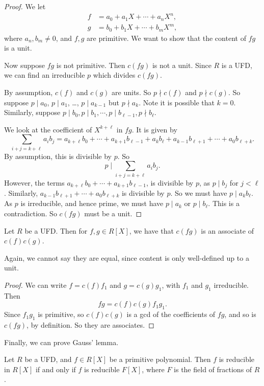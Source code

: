 \documentclass[a4paper]{article}
\begin{document}
\begin{proof}
  We let
  \begin{align*}
    f &= a_0 + a_1X + \cdots + a_n X^n,\\
    g &= b_0 + b_1X + \cdots + b_m X^m,
  \end{align*}
  where $a_n, b_m \not= 0$, and $f, g$ are primitive. We want to show that the content of $fg$ is a unit.

  Now suppose $fg$ is not primitive. Then $c(fg)$ is not a unit. Since $R$ is a UFD, we can find an irreducible $p$ which divides $c(fg)$.

  By assumption, $c(f)$ and $c(g)$ are units. So $p\nmid c(f)$ and $p \nmid c(g)$. So suppose $p \mid a_0$, $p \mid a_1$, \ldots, $p \mid a_{k - 1}$ but $p \nmid a_k$. Note it is possible that $k = 0$. Similarly, suppose $p\mid b_0, p \mid b_1, \cdots, p\mid b_{\ell - 1}, p \nmid b_\ell$.

  We look at the coefficient of $X^{k + \ell}$ in $fg$. It is given by
  \[
    \sum_{i + j = k + \ell} a_i b_j = a_{k + \ell}b_0 + \cdots + a_{k + 1}b_{\ell - 1} + a_k b_{\ell} + a_{k - 1}b_{\ell + 1} + \cdots + a_0 b_{\ell + k}.
  \]
  By assumption, this is divisible by $p$. So
  \[
    p \mid \sum_{i + j = k + \ell} a_i b_j.
  \]
  However, the terms $a_{k + \ell}b_0 + \cdots + a_{k + 1} b_{\ell - 1}$, is divisible by $p$, as $p \mid b_j$ for $j < \ell$. Similarly, $a_{k - 1}b_{\ell + 1} + \cdots + a_0 b_{\ell + k}$ is divisible by $p$. So we must have $p \mid a_k b_\ell$. As $p$ is irreducible, and hence prime, we must have $p \mid a_k$ or $p \mid b_\ell$. This is a contradiction. So $c(fg)$ must be a unit.
\end{proof}

\begin{cor}
  Let $R$ be a UFD. Then for $f, g \in R[X]$, we have that $c(fg)$ is an associate of $c(f)c(g)$.
\end{cor}
Again, we cannot say they are equal, since content is only well-defined up to a unit.

\begin{proof}
  We can write $f = c(f) f_1$ and $g= c(g) g_1$, with $f_1$ and $g_1$ irreducible. Then
  \[
    fg = c(f)c(g) f_1g_1.
  \]
  Since $f_1g_1$ is primitive, so $c(f)c(g)$ is a gcd of the coefficients of $fg$, and so is $c(fg)$, by definition. So they are associates.
\end{proof}

Finally, we can prove Gauss' lemma.
\begin{lemma}
  Let $R$ be a UFD, and $f \in R[X]$ be a primitive polynomial. Then $f$ is reducible in $R[X]$ if and only if $f$ is reducible $F[X]$, where $F$ is the field of fractions of $R$.
\end{lemma}
\end{document}
